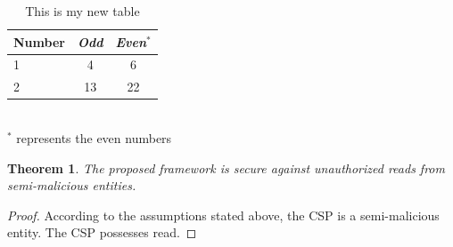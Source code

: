 \documentclass[11pt]{article}
\theoremstyle{plain}
\newtheorem{theorem}{Theorem}
\theoremstyle{definition}
\begin{document}
	
\begin{table}
\centering
\caption{This is my new table}
\label{tbl:new_table}
\begin{tabular}{|l|c|c|}
			\hline
 			\textbf{Number} & \textit{Odd} & \textit{Even$^*$} \\
			\hline \hline
 			1 & 4 & 6 \\ \hline
 			2 & 13 & 22 \\
			\hline
\end{tabular}
\\$^*$ represents the even numbers
\end{table}
	
	


\begin{theorem}\label{thm_csp}
The proposed framework is secure against unauthorized reads from semi-malicious entities.
\end{theorem}
\begin{proof}
According to the assumptions stated above, the CSP is a semi-malicious entity. The CSP possesses read.
\end{proof}
	
\end{document}
